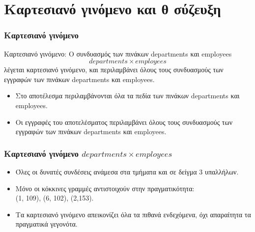\section[]{\textgreek{Καρτεσιανό γινόμενο και θ σύζευξη}}



\begin{frame}
\frametitle{Καρτεσιανό γινόμενο}
\begin{minipage}{\wE}
\begin{block}{Καρτεσιανό γινόμενο:}
Ο συνδυασμός των πινάκων {\ra departments} και {\ra employees}
\[
departments \times employees
\]
λέγεται καρτεσιανό γινόμενο, και περιλαμβάνει όλους τους συνδυασμούς των
εγγραφών των πινάκων {\ra departments} και {\ra employees}.
\pause
\begin{itemize}
  \item Στο αποτέλεσμα περιλαμβάνονται όλα τα πεδία των πινάκων
        {\ra departments} και {\ra employees}.
  \item Οι εγγραφές του αποτελέσματος περιλαμβάνει όλους τους συνδυασμούς των εγγραφών
        των πινάκων {\ra departments} και {\ra employees}.
\end{itemize}  
\end{block}
\end{minipage}
\end{frame}


\begin{frame}
\frametitle{Καρτεσιανό γινόμενο $departments \times employees$}
\begin{itemize}
  \item Όλες οι δυνατές συνδέσεις ανάμεσα στα τμήματα και σε δείγμα 3 υπαλλήλων.
  \item Μόνο οι {\crr κόκκινες γραμμές} αντιστοιχούν στην πραγματικότητα: \\ (1, 109), (6, 102), (2,153).
  \item Τα καρτεσιανό γινόμενο απεικονίζει όλα τα {\bbl πιθανά ενδεχόμενα},
        όχι απαραίτητα τα {\bbl πραγματικά γεγονότα}.
\end{itemize}

\end{frame}




